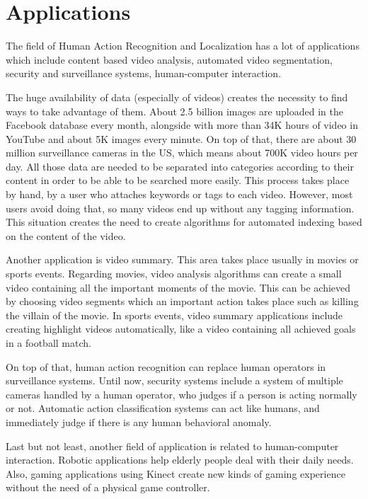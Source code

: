 \section{Applications}
The field of Human Action Recognition and Localization has a lot of applications which include 
 content based video analysis, automated video segmentation, security and surveillance systems,
human-computer interaction.

The huge availability of data (especially of videos) creates the  necessity to find ways to take advantage of them.
About 2.5 billion images are uploaded in the  Facebook database every month, alongside with more than 34K hours of video in YouTube and
about 5K images every minute. On top of that, there are about 30 million surveillance cameras in the US, which means
about 700K video hours per day. All those data are needed to be separated into categories according to their content in
order to be able to be searched more easily. This process takes place by hand, by a user who attaches
keywords or tags to each video. However, most users avoid doing that, so many videos end up without any tagging information.
This situation creates the need to create algorithms for automated indexing based on the content of the video.

Another application is video summary. This area takes place usually in movies or sports events. Regarding movies,
video analysis algorithms can create a small video containing all the important moments of the movie. This
can be achieved by choosing video segments which an important action takes place such as killing the villain
of the movie. In sports events, video summary applications include creating highlight videos automatically, like
a video containing all achieved goals in a football match.

On top of that, human action recognition can replace human operators in surveillance systems. Until now,
security systems include a system of multiple cameras handled by a human operator, who judges if a person
is acting normally or not. Automatic action classification systems can act like humans, and immediately
judge if there is any human behavioral anomaly.

Last but not least, another field of application is related to human-computer interaction. Robotic applications
help elderly people deal with their daily needs. Also, gaming applications using Kinect create new kinds of
gaming experience without the need of a physical game controller.

